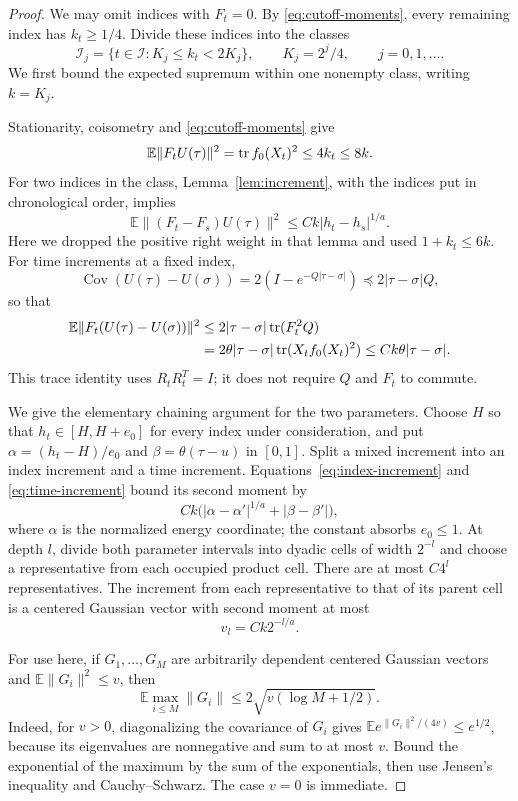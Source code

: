 \begin{proof}
We may omit indices with $F_t=0$.  By
\eqref{eq:cutoff-moments}, every remaining index has $k_t\ge1/4$.
Divide these indices into the classes
\[
 \mathcal I_j=\{t\in\mathcal I:K_j\le k_t<2K_j\},
 \qquad K_j=2^j/4,\qquad j=0,1,\ldots.
\]
We first bound the expected supremum within one nonempty class, writing
$k=K_j$.

Stationarity, coisometry and \eqref{eq:cutoff-moments} give
\begin{equation}\label{eq:vector-second-moment}
 \mathbb E\lVert F_tU(\tau)\rVert^2
 =\operatorname{tr} f_0(X_t)^2\le4k_t\le8k.
\end{equation}
For two indices in the class, Lemma~\ref{lem:increment}, with the indices
put in chronological order, implies
\begin{equation}\label{eq:index-increment}
 \mathbb E\lVert(F_t-F_s)U(\tau)\rVert^2
 \le Ck|h_t-h_s|^{1/a}.
\end{equation}
Here we dropped the positive right weight in that lemma and used
$1+k_t\le6k$.  For time increments at a fixed index,
\[
 \operatorname{Cov}(U(\tau)-U(\sigma))
 =2(I-e^{-Q|\tau-\sigma|})\preceq2|\tau-\sigma|Q,
\]
so that
\begin{align}
 \mathbb E\lVert F_t(U(\tau)-U(\sigma))\rVert^2
 &\le2|\tau-\sigma|\operatorname{tr}(F_t^2Q)\notag\\
 &=2\theta|\tau-\sigma|\operatorname{tr}(X_tf_0(X_t)^2)
 \le Ck\theta|\tau-\sigma|.\label{eq:time-increment}
\end{align}
This trace identity uses $R_tR_t^T=I$; it does not require $Q$ and
$F_t$ to commute.

We give the elementary chaining argument for the two parameters.  Choose
$H$ so that $h_t\in[H,H+e_0]$ for every index under consideration, and put
$\alpha=(h_t-H)/e_0$ and $\beta=\theta(\tau-u)$ in $[0,1]$.
Split a mixed increment into an
index increment and a time increment.  Equations~\eqref{eq:index-increment}
and \eqref{eq:time-increment} bound its second moment by
\[
 Ck\bigl(|\alpha-\alpha'|^{1/a}+|\beta-\beta'|\bigr),
\]
where $\alpha$ is the normalized energy coordinate; the constant absorbs
$e_0\le1$.  At depth $l$, divide both parameter intervals into dyadic
cells of width $2^{-l}$ and choose a representative from each occupied
product cell.  There are at most $C4^l$ representatives.  The increment
from each representative to that of its parent cell is a centered
Gaussian vector with second moment at most
\[
 v_l=Ck2^{-l/a}.
\]

For use here, if $G_1,\ldots,G_M$ are arbitrarily dependent centered
Gaussian vectors and $\mathbb E\lVert G_i\rVert^2\le v$, then
\begin{equation}\label{eq:gaussian-vector-max}
 \mathbb E\max_{i\le M}\lVert G_i\rVert
 \le2\sqrt{v(\log M+1/2)}.
\end{equation}
Indeed, for $v>0$, diagonalizing the covariance of $G_i$ gives
$\mathbb E e^{\lVert G_i\rVert^2/(4v)}\le e^{1/2}$, because its
eigenvalues are nonnegative and sum to at most $v$.  Bound the exponential
of the maximum by the sum of the exponentials, then use Jensen's
inequality and Cauchy--Schwarz.  The case $v=0$ is immediate.


\end{proof}
